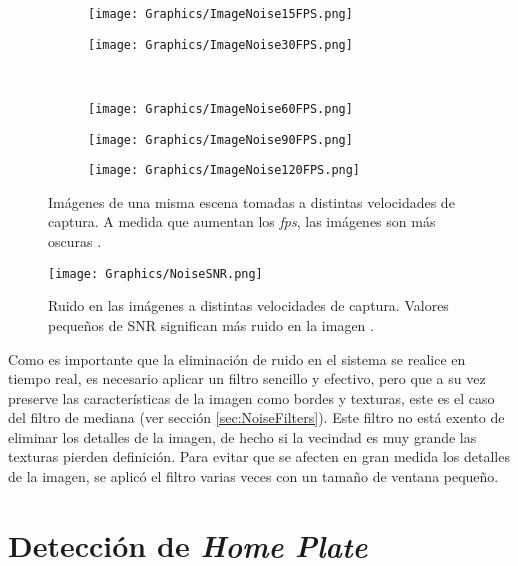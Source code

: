 \begin{figure}[!h]
	\centering
	\begin{subfigure}[b]{0.24\linewidth}
		\centering
		\texttt{[image: Graphics/ImageNoise15FPS.png]}
	\end{subfigure}
	\begin{subfigure}[b]{0.24\linewidth}
		\centering
		\texttt{[image: Graphics/ImageNoise30FPS.png]}
	\end{subfigure}\\
	\begin{subfigure}[b]{0.24\linewidth}
		\centering
		\texttt{[image: Graphics/ImageNoise60FPS.png]}
	\end{subfigure}
	\begin{subfigure}[b]{0.24\linewidth}
		\centering
		\texttt{[image: Graphics/ImageNoise90FPS.png]}
	\end{subfigure}
	\begin{subfigure}[b]{0.24\linewidth}
		\centering
		\texttt{[image: Graphics/ImageNoise120FPS.png]}
	\end{subfigure}
	\caption{Imágenes de una misma escena tomadas a distintas velocidades de captura. A medida que aumentan los \textit{fps}, las imágenes son más oscuras \cite{DVD}.}
	\label{fig:ImageNoiseFPS}
\end{figure}

\begin{figure}[!h]
	\centering
	\texttt{[image: Graphics/NoiseSNR.png]}
	\caption{Ruido en las imágenes a distintas velocidades de captura. Valores pequeños de SNR significan más ruido en la imagen \cite{DVD}.}
	\label{fig:NoiseSNR}
\end{figure}

Como es importante que la eliminación de ruido en el sistema se realice en tiempo real, es necesario aplicar un filtro sencillo y efectivo, pero que a su vez preserve las características de la imagen como bordes y texturas, este es el caso del filtro de mediana (ver sección \ref{sec:NoiseFilters}). Este filtro no está exento de eliminar los detalles de la imagen, de hecho si la vecindad es muy grande las texturas pierden definición. Para evitar que se afecten en gran medida los detalles de la imagen, se aplicó el filtro varias veces con un tamaño de ventana pequeño.

\section{Detección de \textit{Home Plate}}

